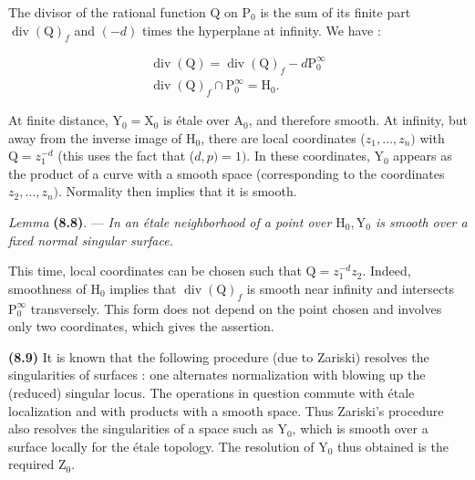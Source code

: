 \documentclass[10pt,leqno]{article}
\begin{document}
\noindent The divisor of the rational function \(\mathrm{Q}\) on \(\mathrm{P}_{0}\) is the sum of its finite part \(\operatorname{div}(\mathrm{Q})_{f}\) and \((-d)\) times the hyperplane at infinity. We have :\par

\begin{equation*}\begin{gathered}\operatorname{div}(\mathrm{Q}) = \operatorname{div}(\mathrm{Q})_{f} - d\mathrm{P}_{0}^{\infty } \\ \operatorname{div}(\mathrm{Q})_{f} \cap  \mathrm{P}_{0}^{\infty } = \mathrm{H}_{0}.\end{gathered}\tag{8.7.1}\end{equation*}

\noindent At finite distance, \(\mathrm{Y}_{0} = \mathrm{X}_{0}\) is étale over \(\mathrm{A}_{0}\), and therefore smooth. At infinity, but away from the inverse image of \(\mathrm{H}_{0}\), there are local coordinates (\(z_{1},\ldots ,z_{n})\) with \(\mathrm{Q} = z_{1}^{-d}\) (this uses the fact that (\(d,p) = 1)\). In these coordinates, \(\mathrm{Y}_{0}\) appears as the product of a curve with a smooth space (corresponding to the coordinates \(z_{2},\ldots ,z_{n})\). Normality then implies that it is smooth.\par

\noindent \emph{Lemma} \textbf{(8.8)}. — {\itshape In an étale neighborhood of a point over \(\mathrm{H}_{0}, \mathrm{Y}_{0}\) is smooth over a fixed normal singular surface.}\par

\noindent This time, local coordinates can be chosen such that \(\mathrm{Q} = z_{1}^{-d}z_{2}\). Indeed, smoothness of \(\mathrm{H}_{0}\) implies that \(\operatorname{div}(\mathrm{Q})_{f}\) is smooth near infinity and intersects \(\mathrm{P}_{0}^{\infty }\) transversely. This form does not depend on the point chosen and involves only two coordinates, which gives the assertion.\par

\noindent \textbf{(8.9)} It is known that the following procedure (due to Zariski) resolves the singularities of surfaces : one alternates normalization with blowing up the (reduced) singular locus. The operations in question commute with étale localization and with products with a smooth space. Thus Zariski's procedure also resolves the singularities of a space such as \(\mathrm{Y}_{0}\), which is smooth over a surface locally for the étale topology. The resolution of \(\mathrm{Y}_{0}\) thus obtained is the required \(\mathrm{Z}_{0}\).\par
\end{document}
